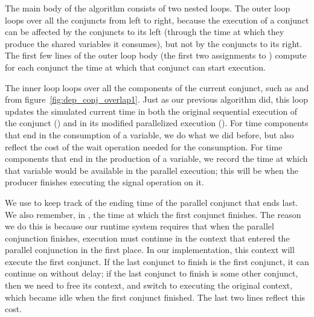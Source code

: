 The main body of the algorithm consists of two nested loops.
The outer loop loops over all the conjuncts from left to right,
because the execution of a conjunct can be affected
by the conjuncts to its left
(through the time at which they produce the shared variables it consumes),
but not by the conjuncts to its right.
The first few lines of the outer loop body
(the first two assignments to )
compute for each conjunct
the time at which that conjunct can start execution.

The inner loop loops over all the components of the current conjunct,
such as  and 
from figure~\ref{fig:dep_conj_overlap1}.
Just as our previous algorithm did,
this loop updates the simulated current time
in both the original sequential execution of the conjunct ()
and in its modified parallelized execution ().
For time components that end in the consumption of a variable,
we do what we did before,
but also reflect the cost of the wait operation needed for the consumption.
For time components that end in the production of a variable,
we record the time at which
that variable would be available in the parallel execution;
this will be when the producer finishes executing the signal operation on it.

We use  to keep track of the ending time
of the parallel conjunct that ends last.
We also remember, in ,
the time at which the first conjunct finishes.
The reason we do this is because
our runtime system requires that
when the parallel conjunction finishes,
execution must continue in the context
that entered the parallel conjunction in the first place.
In our implementation, this context will execute the first conjunct.
If the last conjunct to finish is the first conjunct,
it can continue on without delay;
if the last conjunct to finish is some other conjunct,
then we need to free its context,
and switch to executing the original context,
which became idle when the first conjunct finished.
The last two lines reflect this cost.


